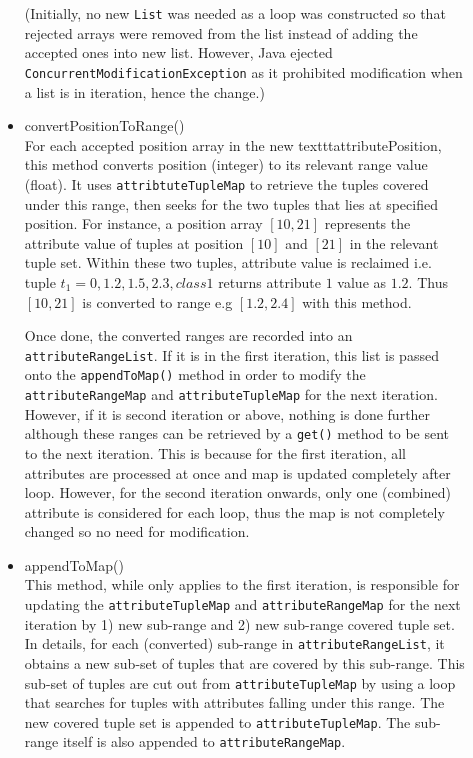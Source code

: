 \begin{description}
\begin{itemize}
	 (Initially, no new \texttt{List} was needed as a loop was constructed so that rejected arrays were removed from the list instead of adding the accepted ones into new list. However, Java ejected \texttt{ConcurrentModificationException} as it prohibited modification when a list is in iteration, hence the change.)
	
	\item{convertPositionToRange()} \\
	For each accepted position array in the new  texttt{attributePosition}, this method converts position (integer) to its relevant range value (float). It uses \texttt{attribtuteTupleMap} to retrieve the tuples covered under this range, then seeks for the two tuples that lies at specified position. For instance, a position array $[10,21]$ represents the attribute value of tuples at position $[10]$ and $[21]$ in the relevant tuple set. Within these two tuples, attribute value is reclaimed i.e. tuple $t_1 = {0, 1.2, 1.5, 2.3, class1}$ returns attribute $1$ value as $1.2$. Thus $[10,21]$ is converted to range e.g $[1.2, 2.4]$ with this method.
	
	Once done, the converted ranges are recorded into an \texttt{attributeRangeList}. If it is in the first iteration, this list is passed onto the \texttt{appendToMap()} method in order to modify the \texttt{attributeRangeMap} and \texttt{attributeTupleMap} for the next iteration. However, if it is second iteration or above, nothing is done further although these ranges can be retrieved by a \texttt{get()} method to be sent to the next iteration. This is because for the first iteration, all attributes are processed at once and map is updated completely after loop. However, for the second iteration onwards, only one (combined) attribute is considered for each loop, thus the map is not completely changed so no need for modification. 
	
	\item{appendToMap()} \\
	This method, while only applies to the first iteration, is responsible for updating the \texttt{attributeTupleMap} and \texttt{attributeRangeMap} for the next iteration by 1) new sub-range and 2) new sub-range covered tuple set. In details, for each (converted) sub-range in \texttt{attributeRangeList}, it obtains a new sub-set of tuples that are covered by this sub-range. This sub-set of tuples are cut out from \texttt{attributeTupleMap} by using a loop that searches for tuples with attributes falling under this range. The new covered tuple set is appended to \texttt{attributeTupleMap}. The sub-range itself is also appended to \texttt{attributeRangeMap}. 
	

\end{itemize}
\end{description}
